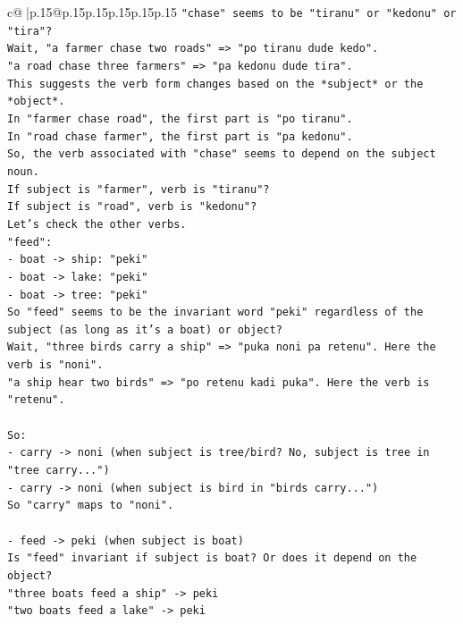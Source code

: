 \documentclass{article}
\begin{document}
{\begin{supertabular}{c@{$\;$}|p{.15\linewidth}@{}p{.15\linewidth}p{.15\linewidth}p{.15\linewidth}p{.15\linewidth}p{.15\linewidth}}
{{{\texttt{"chase" seems to be "tiranu" or "kedonu" or "tira"?} \\
\texttt{Wait, "a farmer chase two roads" => "po tiranu dude kedo".} \\
\texttt{"a road chase three farmers" => "pa kedonu dude tira".} \\
\texttt{This suggests the verb form changes based on the *subject* or the *object*.} \\
\texttt{In "farmer chase road", the first part is "po tiranu".} \\
\texttt{In "road chase farmer", the first part is "pa kedonu".} \\
\texttt{So, the verb associated with "chase" seems to depend on the subject noun.} \\
\texttt{If subject is "farmer", verb is "tiranu"?} \\
\texttt{If subject is "road", verb is "kedonu"?} \\
\texttt{Let's check the other verbs.} \\
\texttt{"feed":} \\
\texttt{{-} boat {-}> ship: "peki"} \\
\texttt{{-} boat {-}> lake: "peki"} \\
\texttt{{-} boat {-}> tree: "peki"} \\
\texttt{So "feed" seems to be the invariant word "peki" regardless of the subject (as long as it's a boat) or object?} \\
\texttt{Wait, "three birds carry a ship" => "puka noni pa retenu". Here the verb is "noni".} \\
\texttt{"a ship hear two birds" => "po retenu kadi puka". Here the verb is "retenu".} \\
\\ 
\texttt{So:} \\
\texttt{{-} carry {-}> noni (when subject is tree/bird? No, subject is tree in "tree carry...")} \\
\texttt{{-} carry {-}> noni (when subject is bird in "birds carry...")} \\
\texttt{So "carry" maps to "noni".} \\
\\ 
\texttt{{-} feed {-}> peki (when subject is boat)} \\
\texttt{Is "feed" invariant if subject is boat? Or does it depend on the object?} \\
\texttt{"three boats feed a ship" {-}> peki} \\
\texttt{"two boats feed a lake" {-}> peki} \\
}}}
\end{supertabular}}
\end{document}
